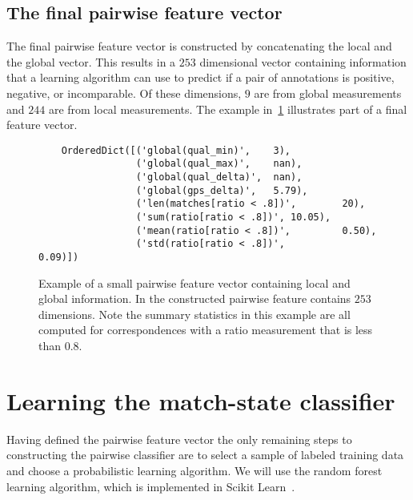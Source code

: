 \FloatBarrier{}
\subsection{The final pairwise feature vector}

The final pairwise feature vector is constructed by concatenating the local and the global vector.
This results in a $253$ dimensional vector containing information that a learning algorithm can use to predict if
  a pair of annotations is positive, negative, or incomparable.
Of these dimensions, $9$ are from global measurements and $244$ are from local measurements.
The example in~\cref{fig:PairFeatVec} illustrates part of a final feature vector.

\begin{figure}
\begin{verbatim}
    OrderedDict([('global(qual_min)',    3),
                 ('global(qual_max)',    nan),
                 ('global(qual_delta)',  nan),
                 ('global(gps_delta)',   5.79),
                 ('len(matches[ratio < .8])',        20),
                 ('sum(ratio[ratio < .8])', 10.05),
                 ('mean(ratio[ratio < .8])',         0.50),
                 ('std(ratio[ratio < .8])',          0.09)])
\end{verbatim}
\caption[A pairwise feature vector]{ %
Example of a small pairwise feature vector containing local and global information.
In the constructed pairwise feature contains $253$ dimensions.
Note the summary statistics in this example are all computed for correspondences with a ratio measurement that is
  less than $0.8$.
}
\label{fig:PairFeatVec}
\end{figure}



\section{Learning the match-state classifier}\label{sec:learnclf}

    Having defined the pairwise feature vector the only remaining steps to constructing the pairwise classifier
      are to select a sample of labeled training data and choose a probabilistic learning algorithm.
    We will use the random forest learning algorithm, which is implemented in Scikit
      Learn~\cite{pedregosa_scikit_learn_2011}.

